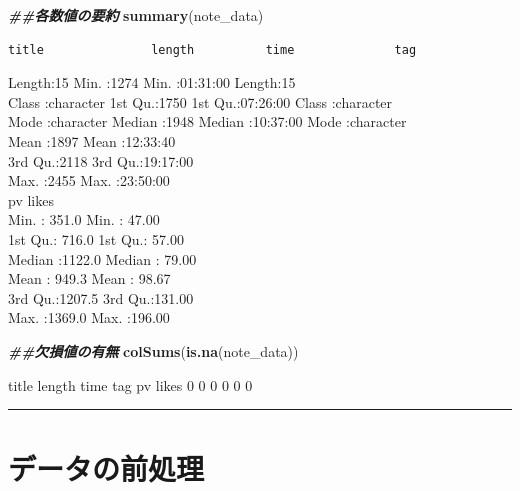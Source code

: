 \documentclass[
]{article}
\newenvironment{Shaded}{\begin{snugshade}}{\end{snugshade}}
\newcommand{\DocumentationTok}[1]{\textcolor[rgb]{0.56,0.35,0.01}{\textbf{\textit{#1}}}}
\newcommand{\FunctionTok}[1]{\textcolor[rgb]{0.13,0.29,0.53}{\textbf{#1}}}
\newcommand{\NormalTok}[1]{#1}
\begin{document}
\begin{Shaded}
\begin{Highlighting}[]
\DocumentationTok{\#\#各数値の要約}
\FunctionTok{summary}\NormalTok{(note\_data)}
\end{Highlighting}
\end{Shaded}

\begin{verbatim}
title               length          time              tag           
\end{verbatim}

Length:15 Min. :1274 Min. :01:31:00 Length:15\\
Class :character 1st Qu.:1750 1st Qu.:07:26:00 Class :character\\
Mode :character Median :1948 Median :10:37:00 Mode :character\\
Mean :1897 Mean :12:33:40\\
3rd Qu.:2118 3rd Qu.:19:17:00\\
Max. :2455 Max. :23:50:00\\
pv likes\\
Min. : 351.0 Min. : 47.00\\
1st Qu.: 716.0 1st Qu.: 57.00\\
Median :1122.0 Median : 79.00\\
Mean : 949.3 Mean : 98.67\\
3rd Qu.:1207.5 3rd Qu.:131.00\\
Max. :1369.0 Max. :196.00

\begin{Shaded}
\begin{Highlighting}[]
\DocumentationTok{\#\#欠損値の有無}
\FunctionTok{colSums}\NormalTok{(}\FunctionTok{is.na}\NormalTok{(note\_data))}
\end{Highlighting}
\end{Shaded}

title length time tag pv likes 0 0 0 0 0 0

\begin{center}\rule{0.5\linewidth}{0.5pt}\end{center}

\section{データの前処理}\label{ux30c7ux30fcux30bfux306eux524dux51e6ux7406}
\end{document}
